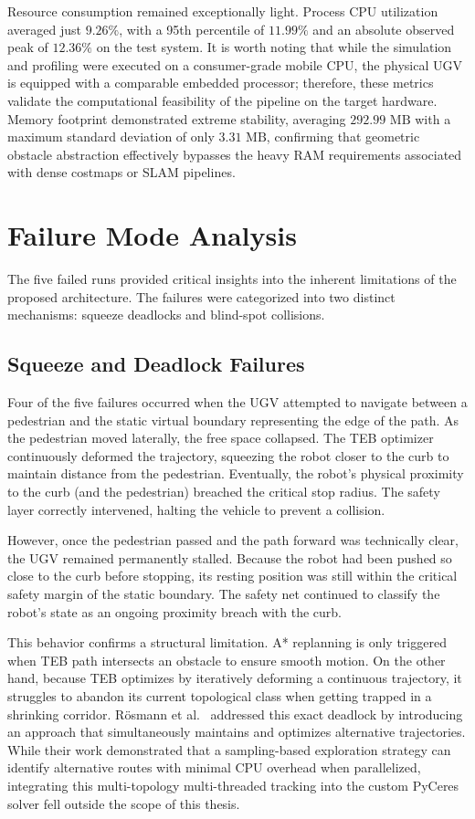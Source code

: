 Resource consumption remained exceptionally light. Process CPU utilization averaged just $9.26\%$, with a 95th percentile of $11.99\%$ and an absolute observed peak of $12.36\%$ on the test system. It is worth noting that while the simulation and profiling were executed on a consumer-grade mobile CPU, the physical UGV is equipped with a comparable embedded processor; therefore, these metrics validate the computational feasibility of the pipeline on the target hardware. Memory footprint demonstrated extreme stability, averaging $292.99\text{ MB}$ with a maximum standard deviation of only $3.31\text{ MB}$, confirming that geometric obstacle abstraction effectively bypasses the heavy RAM requirements associated with dense costmaps or SLAM pipelines.

\section{Failure Mode Analysis}
\label{sec:failure-analysis}

The five failed runs provided critical insights into the inherent limitations of the proposed architecture. The failures were categorized into two distinct mechanisms: squeeze deadlocks and blind-spot collisions.

\subsection{Squeeze and Deadlock Failures}
Four of the five failures occurred when the UGV attempted to navigate between a pedestrian and the static virtual boundary representing the edge of the path. As the pedestrian moved laterally, the free space collapsed. The TEB optimizer continuously deformed the trajectory, squeezing the robot closer to the curb to maintain distance from the pedestrian. Eventually, the robot's physical proximity to the curb (and the pedestrian) breached the critical stop radius. The safety layer correctly intervened, halting the vehicle to prevent a collision.

However, once the pedestrian passed and the path forward was technically clear, the UGV remained permanently stalled. Because the robot had been pushed so close to the curb before stopping, its resting position was still within the critical safety margin of the static boundary. The safety net continued to classify the robot's state as an ongoing proximity breach with the curb.

This behavior confirms a structural limitation. A* replanning is only triggered when TEB path intersects an obstacle to ensure smooth motion. On the other hand, because TEB optimizes by iteratively deforming a continuous trajectory, it struggles to abandon its current topological class when getting trapped in a shrinking corridor. R\"osmann et al.~\cite{rossman2017teb} addressed this exact deadlock by introducing an approach that simultaneously maintains and optimizes alternative trajectories. While their work demonstrated that a sampling-based exploration strategy can identify alternative routes with minimal CPU overhead when parallelized, integrating this multi-topology multi-threaded tracking into the custom PyCeres solver fell outside the scope of this thesis.


